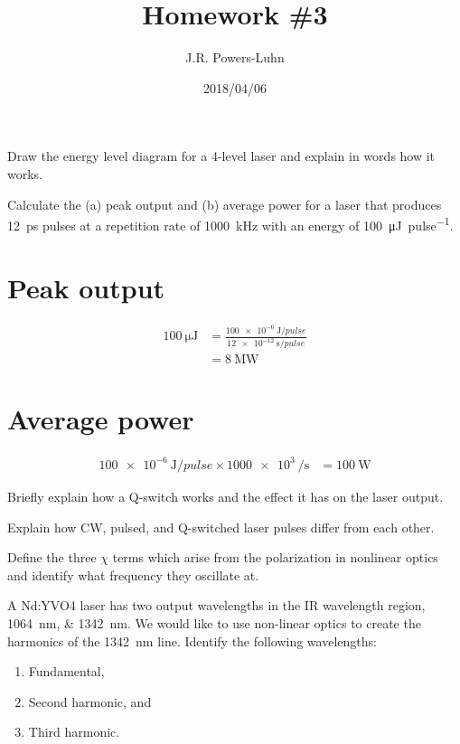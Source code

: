 \documentclass{hw}
\title{Homework \#3}
\author{J.R. Powers-Luhn}
\date{2018/04/06}
\begin{document}
\problem{}

Draw the energy level diagram for a 4-level laser and explain in words how it works.

\solution



\problem{}

Calculate the (a) peak output and (b) average power for a laser that produces \SI{12}{\pico\second} pulses at a repetition rate of \SI{1000}{\kilo\hertz} with an energy of \SI{100}{\micro\joule\per pulse}.

\solution

\part{Peak output}
    \begin{align*}
        \SI{100}{\micro\joule} &= \frac{\SI{100e-6}{\joule\per pulse}}{\SI{12e-12}{\second\per pulse}} \\
        &= \SI{8}{\mega\watt}
    \end{align*}

\part{Average power}
    \begin{align*}
        \SI{100e-6}{\joule\per pulse} \times \SI{1000e3}{\per\second} &= \SI{100}{\watt}
    \end{align*}

\problem{}

Briefly explain how a Q-switch works and the effect it has on the laser output.

\solution



\problem{}

Explain how CW, pulsed, and Q-switched laser pulses differ from each other.

\solution



\problem{}

Define the three $\chi$ terms which arise from the polarization in nonlinear optics and identify what frequency they oscillate at.

\solution



\problem{}

A Nd:YVO4 laser has two output wavelengths in the IR wavelength region, \SIlist{1064;1342}{\nano\meter}. We would like to use non-linear optics to create the harmonics of the \SI{1342}{\nano\meter} line. Identify the following wavelengths:
\begin{enumerate}
    \item Fundamental,
    \item Second harmonic, and
    \item Third harmonic.
\end{enumerate}
\end{document}
